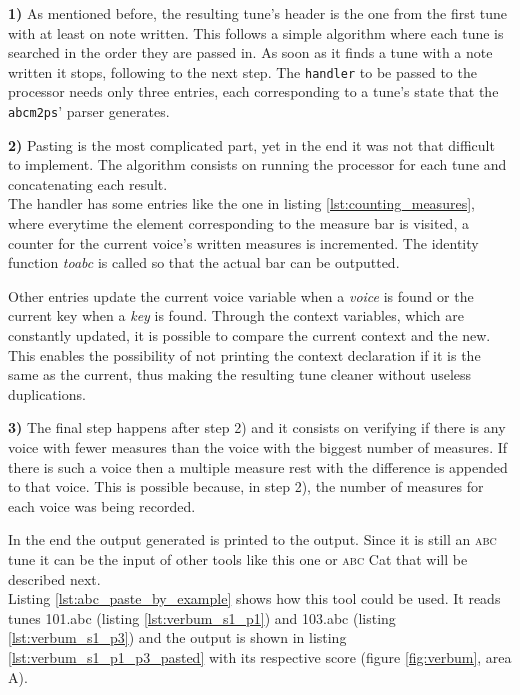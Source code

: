 \documentclass[a4paper,UKenglish]{oasics}
\newcommand{\abc}{\textsc{abc}}
\newcommand{\toabc}{\emph{toabc}}
\newcommand{\abcmtops}{\texttt{abcm2ps}}
\begin{document}
\textbf{1)} As mentioned before, the resulting tune's header is the one from the first tune with at
least on note written. This follows a simple algorithm where each tune is searched in the order they
are passed in. As soon as it finds a tune with a note written it stops, following to the next step.
The \texttt{handler} to be passed to the processor needs only three entries, each corresponding to a
tune's state that the \abcmtops' parser generates.

\textbf{2)} Pasting is the most complicated part, yet in the end it was not that difficult to
implement. The algorithm consists on running the processor for each tune and concatenating each
result.\\
The handler has some entries like the one in listing \ref{lst:counting_measures}, where everytime
the element corresponding to the measure bar is visited, a counter for the current voice's written
measures is incremented. The identity function \toabc{} is called so that the actual bar
can be outputted.

Other entries update the current voice variable when a \textit{voice} is found or the current key
when a \textit{key} is found. Through the context variables, which are constantly updated, it is
possible to compare the current context and the new. This enables the possibility of not printing the
context declaration if it is the same as the current, thus making the resulting tune cleaner without
useless duplications.

\textbf{3)} The final step happens after step 2) and it consists on verifying if there is any voice
with fewer measures than the voice with the biggest number of measures. If there is such a voice
then a multiple measure rest with the difference is appended to that voice. This is possible
because, in step 2), the number of measures for each voice was being recorded.

In the end the output generated is printed to the output. Since it is still an \abc{} tune it can
be the input of other tools like this one or \abc{} Cat that will be described next.\\

Listing \ref{lst:abc_paste_by_example} shows how this tool could be used. It reads tunes 101.abc
(listing \ref{lst:verbum_s1_p1}) and 103.abc (listing \ref{lst:verbum_s1_p3}) and the output is
shown in listing \ref{lst:verbum_s1_p1_p3_pasted} with its respective score (figure
\ref{fig:verbum}, area A).
\end{document}
